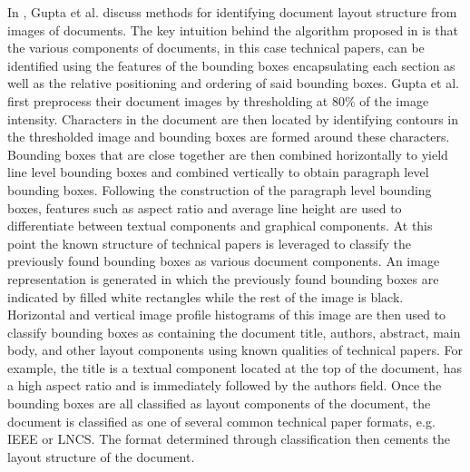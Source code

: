 \documentclass[10pt]{IEEEtran}
\begin{document}
In \cite{3}, Gupta et al. discuss methods for identifying document layout structure from images of documents. The key intuition behind the algorithm proposed in \cite{3} is that the various components of documents, in this case technical papers, can be identified using the features of the bounding boxes encapsulating each section as well as the relative positioning and ordering of said bounding boxes. Gupta et al. first preprocess their document images by thresholding at 80\% of the image intensity.
Characters in the document are then located by identifying contours in the thresholded image and bounding boxes are formed around these characters. Bounding boxes that are close together are then combined horizontally to yield line level bounding boxes and combined vertically to obtain paragraph level bounding boxes. Following the construction of the paragraph level bounding boxes, features such as aspect ratio and average line height are used to differentiate between textual components and graphical components.
At this point the known structure of technical papers is leveraged to classify the previously found bounding boxes as various document components. An image representation is generated in which the previously found bounding boxes are indicated by filled white rectangles while the rest of the image is black. Horizontal and vertical image profile histograms of this image are then used to classify bounding boxes as containing the document title, authors, abstract, main body, and other layout components using known qualities of technical papers. For example, the title is a textual component located at the top of the document, has a high aspect ratio and is immediately followed by the authors field. Once the bounding boxes are all classified as layout components of the document, the document is classified as one of several common technical paper formats, e.g. IEEE or LNCS. The format determined through classification then cements the layout structure of the document.
\end{document}
